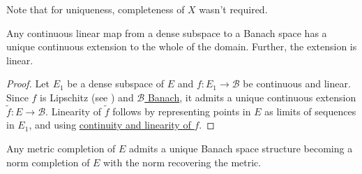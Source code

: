 	\begin{rmk}
		Note that for uniqueness, completeness of $X$ wasn't required.
	\end{rmk}
	
	
	\begin{lem}\label{LEM: cont extensions preserve linearity}
		Any continuous linear map from a dense subspace to a Banach space has a unique continuous extension to the whole of the domain. Further, the extension is linear.
	\end{lem}
	
	\begin{proof}
		Let $E_1$ be a dense subspace of $E$ and $f\colon E_1\to \mathscr B$ be continuous and linear. Since $f$ is Lipschitz (see ) and \uline{$\mathscr B$ Banach}, it admits a unique continuous extension $\tilde f\colon E\to\mathscr B$. Linearity of $\tilde f$ follows by representing points in $E$ as limits of sequences in $E_1$, and using \uline{continuity and linearity of $f$}.
	\end{proof}
	
	
	\begin{prp}
		Any metric completion of $E$ admits a unique Banach space structure becoming a norm completion of $E$ with the norm recovering the metric.
	\end{prp}
	
